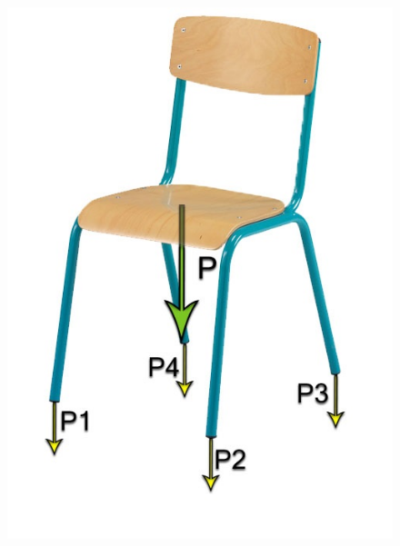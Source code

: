 \documentclass{polytech/polytech}
\begin{document}
\begin{figure}[htbp]
\begin{center}
\includegraphics[scale=1]{image/Chaise_forces_homo.jpg}

\end{center}
\end{figure}
\end{document}
